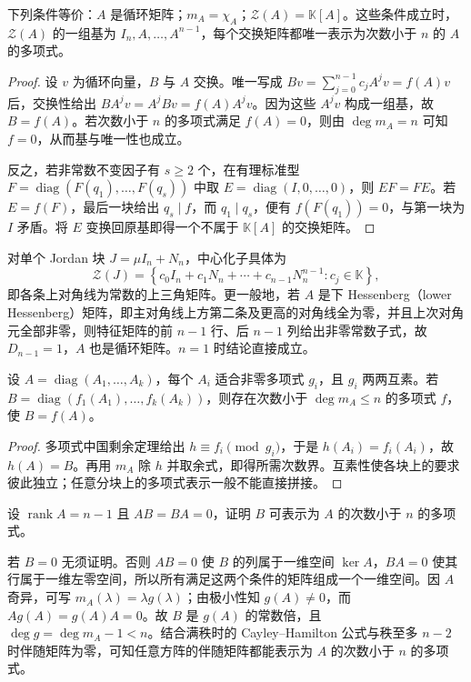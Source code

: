\begin{theorem}
\label{thm:xie-ex-sim-centralizer}
下列条件等价：$A$ 是循环矩阵；$m_A=\chi_A$；$\mathcal Z(A)=\mathbb K[A]$。这些条件成立时，$\mathcal Z(A)$ 的一组基为 $I_n,A,\ldots,A^{n-1}$，每个交换矩阵都唯一表示为次数小于 $n$ 的 $A$ 的多项式。
\end{theorem}
\begin{proof}
设 $v$ 为循环向量，$B$ 与 $A$ 交换。唯一写成 $Bv=\sum_{j=0}^{n-1}c_jA^jv=f(A)v$ 后，交换性给出 $BA^jv=A^jBv=f(A)A^jv$。因为这些 $A^jv$ 构成一组基，故 $B=f(A)$。若次数小于 $n$ 的多项式满足 $f(A)=0$，则由 $\deg m_A=n$ 可知 $f=0$，从而基与唯一性也成立。

反之，若非常数不变因子有 $s\geq2$ 个，在有理标准型 $F=\operatorname{diag}(F(q_1),\ldots,F(q_s))$ 中取 $E=\operatorname{diag}(I,0,\ldots,0)$，则 $EF=FE$。若 $E=f(F)$，最后一块给出 $q_s\mid f$，而 $q_1\mid q_s$，便有 $f(F(q_1))=0$，与第一块为 $I$ 矛盾。将 $E$ 变换回原基即得一个不属于 $\mathbb K[A]$ 的交换矩阵。
\end{proof}

对单个 Jordan 块 $J=\mu I_n+N_n$，中心化子具体为
\[
 \mathcal Z(J)=\left\{c_0I_n+c_1N_n+\cdots+c_{n-1}N_n^{n-1}:c_j\in\mathbb K\right\},
\]
即各条上对角线为常数的上三角矩阵。更一般地，若 $A$ 是下 Hessenberg（lower Hessenberg）矩阵，即主对角线上方第二条及更高的对角线全为零，并且上次对角元全部非零，则特征矩阵的前 $n-1$ 行、后 $n-1$ 列给出非零常数子式，故 $D_{n-1}=1$，$A$ 也是循环矩阵。$n=1$ 时结论直接成立。

\begin{proposition}[分块多项式的拼接]
\label{prop:xie-ex-sim-crt}
设 $A=\operatorname{diag}(A_1,\ldots,A_k)$，每个 $A_i$ 适合非零多项式 $g_i$，且 $g_i$ 两两互素。若 $B=\operatorname{diag}(f_1(A_1),\ldots,f_k(A_k))$，则存在次数小于 $\deg m_A\leq n$ 的多项式 $f$，使 $B=f(A)$。
\end{proposition}
\begin{proof}
多项式中国剩余定理给出 $h\equiv f_i\pmod{g_i}$，于是 $h(A_i)=f_i(A_i)$，故 $h(A)=B$。再用 $m_A$ 除 $h$ 并取余式，即得所需次数界。互素性使各块上的要求彼此独立；任意分块上的多项式表示一般不能直接拼接。
\end{proof}

\begin{example}
设 $\operatorname{rank}A=n-1$ 且 $AB=BA=0$，证明 $B$ 可表示为 $A$ 的次数小于 $n$ 的多项式。
\end{example}
\begin{solve}
若 $B=0$ 无须证明。否则 $AB=0$ 使 $B$ 的列属于一维空间 $\ker A$，$BA=0$ 使其行属于一维左零空间，所以所有满足这两个条件的矩阵组成一个一维空间。因 $A$ 奇异，可写 $m_A(\lambda)=\lambda g(\lambda)$；由极小性知 $g(A)\ne0$，而 $Ag(A)=g(A)A=0$。故 $B$ 是 $g(A)$ 的常数倍，且 $\deg g=\deg m_A-1<n$。结合满秩时的 Cayley--Hamilton 公式与秩至多 $n-2$ 时伴随矩阵为零，可知任意方阵的伴随矩阵都能表示为 $A$ 的次数小于 $n$ 的多项式。
\end{solve}

